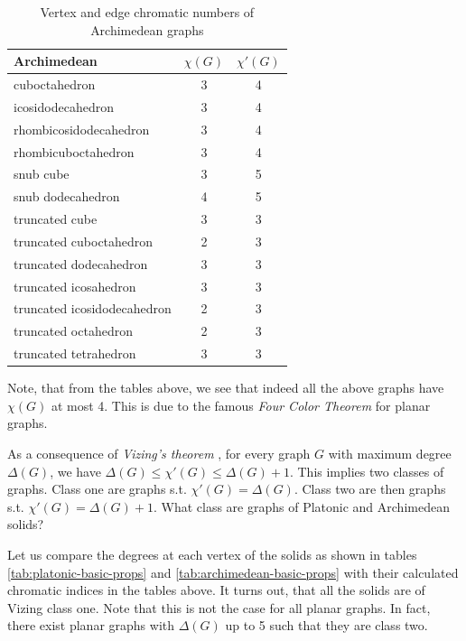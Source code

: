 \begin{table}[H]
    \centering
    \caption{Vertex and edge chromatic numbers of Archimedean graphs}
    \vspace{5pt}
    \label{tab:archimedean-chrom-nums}
    \begin{tabular}{|l|c|c|}
    \hline
    Archimedean & $\chi(G)$ & $\chi'(G)$ \\
    \hline\hline
    cuboctahedron & 3 & 4 \\
    \hline
    icosidodecahedron & 3 & 4 \\
    \hline
    rhombicosidodecahedron & 3 & 4 \\
    \hline
    rhombicuboctahedron & 3 & 4 \\
    \hline
    snub cube & 3 & 5 \\
    \hline
    snub dodecahedron & 4 & 5 \\
    \hline
    truncated cube & 3 & 3 \\
    \hline
    truncated cuboctahedron & 2 & 3 \\
    \hline
    truncated dodecahedron & 3 & 3 \\
    \hline
    truncated icosahedron & 3 & 3 \\
    \hline
    truncated icosidodecahedron & 2 & 3 \\
    \hline
    truncated octahedron & 2 & 3 \\
    \hline
    truncated tetrahedron & 3 & 3 \\
    \hline
    \end{tabular}
\end{table}

Note, that from the tables above, we see that indeed all the above graphs have $\chi(G)$ at most 4. This is due to the famous \textit{Four Color Theorem} \cite{appelhaken76} for planar graphs.

\begin{highlight}

As a consequence of \textit{Vizing's theorem} \cite{misra92}, for every graph $G$ with maximum degree $\Delta(G)$, we have $\Delta(G) \leq \chi'(G) \leq \Delta(G) + 1$. This implies two classes of graphs. Class one are graphs s.t. $\chi'(G) = \Delta(G)$. Class two are then graphs s.t. $\chi'(G) = \Delta(G) + 1$. What class are graphs of Platonic and Archimedean solids?

Let us compare the degrees at each vertex of the solids as shown in tables \ref{tab:platonic-basic-props} and \ref{tab:archimedean-basic-props} with their calculated chromatic indices in the tables above. It turns out, that all the solids are of Vizing class one. Note that this is not the case for all planar graphs. In fact, there exist planar graphs with $\Delta(G)$ up to 5 such that they are class two.

\end{highlight}

